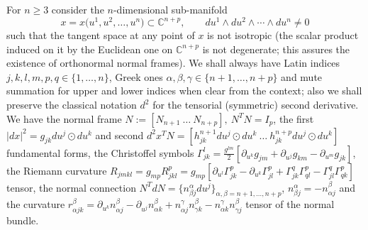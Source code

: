 \documentclass[pdftex]{sigma}
\begin{document}
For $n\ge 3$ consider the $n$-dimensional sub-manifold
\[
 x=x\big(u^1,u^2,\dots ,u^n\big)\subset\mathbb{C}^{n+p}, \qquad
du^1\wedge du^2\wedge\cdots \wedge du^n\neq 0
\]
such that the tangent
space at any point of $x$ is not isotropic (the scalar product
induced on it by the Euclidean one on $\mathbb{C}^{n+p}$ is not
degenerate; this assures the existence of orthonormal normal
frames). We shall always have Latin indices
$j,k,l,m,p,q\in\{1,\dots ,n\}$, Greek ones
$\alpha,\beta,\gamma\in\{n+1,\dots ,n+p\}$ and mute summation for upper and
lower indices when clear from the context; also we shall preserve
the classical notation $d^2$ for the tensorial (symmetric) second
derivative. We have the normal frame $N:=[N_{n+1} \ \dots \
N_{n+p}],\ N^TN=I_p$, the f\/irst $|dx|^2=g_{jk}du^j\odot du^k$ and
second $d^2x^TN=[h_{jk}^{n+1}du^j\odot du^k\ \dots \
h_{jk}^{n+p}du^j\odot du^k]$ fundamental forms, the Christof\/fel
symbols
$\Gamma_{jk}^l=\frac{g^{lm}}{2}[\partial_{u^k}g_{jm}+\partial_{u^j}g_{km}-\partial_{u^m}g_{jk}]$,
the Riemann curvature
$R_{jmkl}=g_{mp}R^p_{jkl}=g_{mp}[\partial_{u^l}\Gamma_{jk}^p-\partial_{u^k}\Gamma_{jl}^p+\Gamma_{jk}^q\Gamma_{ql}^p
-\Gamma_{jl}^q\Gamma_{qk}^p]$ tensor, the normal connection
$N^TdN=\{n^{\alpha}_{\beta j}du^j\}_{\alpha,\beta=n+1,\dots ,n+p}$, $n^{\alpha}_{\beta j}=-n^{\beta}_{\alpha j}$ and the curvature
$r_{\alpha jk}^{\beta}=\partial_{u^k}n_{\alpha
j}^{\beta}-\partial_{u^j}n_{\alpha k}^{\beta}+n_{\alpha
j}^{\gamma}n_{\gamma k}^{\beta}-n_{\alpha k}^{\gamma}n_{\gamma
j}^{\beta}$ tensor of the normal bundle.
\end{document}
